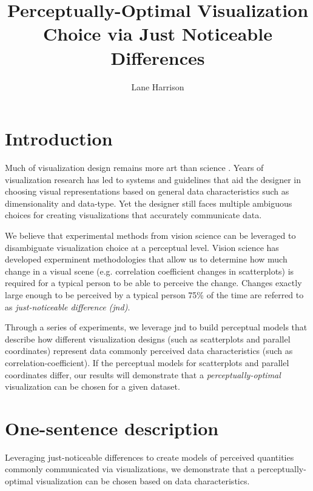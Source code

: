 \documentclass{proc}
\begin{document}
\title{Perceptually-Optimal Visualization Choice via Just Noticeable Differences}

\author{Lane Harrison}

\maketitle

\section{Introduction}

Much of visualization design remains more art than science \cite{cleveland1982variables}. 
Years of visualization research has led to systems \cite{Mackinlay2007} and guidelines \cite{Zacks1999} that aid the designer in choosing visual representations based on general data characteristics such as dimensionality and data-type.
Yet the designer still faces multiple ambiguous choices for creating visualizations that accurately communicate data.

We believe that experimental methods from vision science can be leveraged to disambiguate visualization choice at a perceptual level.
Vision science has developed experminent methodologies that allow us to determine how much change in a visual scene (e.g. correlation coefficient changes in scatterplots) is required for a typical person to be able to perceive the change.   
Changes exactly large enough to be perceived by a typical person 75\% of the time are referred to as \emph{just-noticeable difference (jnd)}.

Through a series of experiments, we leverage jnd to build perceptual models that describe how different visualization designs (such as scatterplots and parallel coordinates) represent data commonly perceived data characteristics (such as  correlation-coefficient).
If the perceptual models for scatterplots and parallel coordinates differ, our results will demonstrate that a \emph{perceptually-optimal} visualization can be chosen for a given dataset.

\section{One-sentence description}

Leveraging just-noticeable differences to create models of perceived quantities commonly communicated via visualizations, we demonstrate that a perceptually-optimal visualization can be chosen based on data characteristics.
\end{document}
